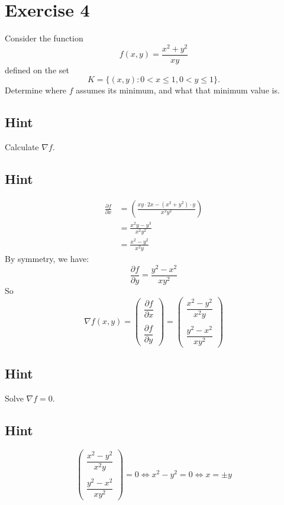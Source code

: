 \documentclass[a4paper,10pt]{article}
\begin{document}
\clearpage

\section{Exercise 4}

Consider the function
\[
    f(x,y) = \frac{x^2 + y^2}{xy}
\]
defined on the set
\[
    K = \{(x,y): 0 < x \leq 1, 0 < y \leq 1\}.
\]
Determine where $f$ assumes its minimum, and what that minimum value is.

\subsection{Hint}
Calculate $\nabla f$.

\subsection{Hint}
\begin{align*}
    \frac{\partial f}{\partial x} & = \left(\frac{xy\cdot 2x - (x^2+y^2)\cdot y}{x^2y^2}\right) \\
                                  & = \frac{x^2y - y^3}{x^2y^2}                                 \\
                                  & = \frac{x^2 - y^2}{x^2y}
\end{align*}
By symmetry, we have:
\[
    \frac{\partial f}{\partial y} = \frac{y^2 - x^2}{xy^2}
\]
So
\[
    \nabla f(x,y) = \begin{pmatrix}
        \dfrac{\partial f}{\partial x} \\ \\ \dfrac{\partial f}{\partial y}
    \end{pmatrix} = \begin{pmatrix}
        \dfrac{x^2 - y^2}{x^2y} \\ \\ \dfrac{y^2 - x^2}{xy^2}
    \end{pmatrix}
\]

\subsection{Hint}
Solve $\nabla f = 0$.

\subsection{Hint}
\[
    \begin{pmatrix}
        \dfrac{x^2 - y^2}{x^2y} \\ \\ \dfrac{y^2 - x^2}{xy^2}
    \end{pmatrix} = 0 \iff x^2 - y^2 = 0 \iff x = \pm y
\]
\end{document}
